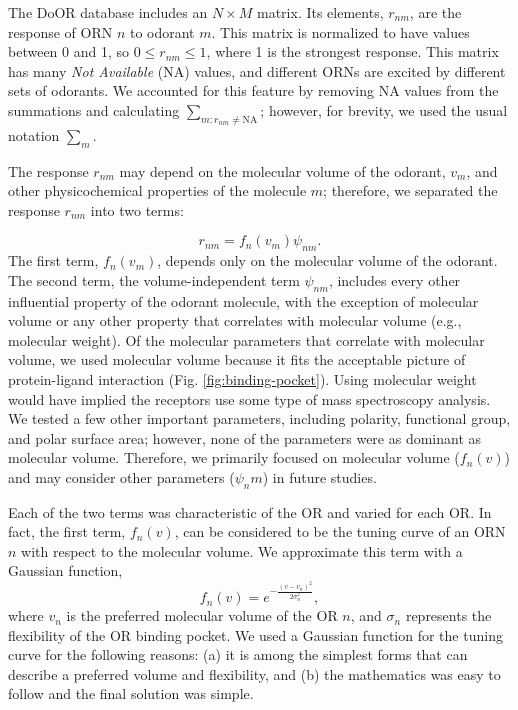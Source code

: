 \documentclass[fleqn,11pt]{wlscirep}
\begin{document}
The DoOR database includes an $N\times M$ matrix. 
Its elements, $r_{nm}$, are the response of ORN $n$ to odorant $m$. 
This matrix is normalized to have values between 0 and 1, so $0 \le r_{nm} \le 1$, where 1 is the strongest response.
This matrix has many {\it Not Available} (NA) values, 
and different ORNs are excited by different sets of odorants. 
We accounted for this feature by removing NA values from the summations and calculating $\sum_{m: r_{nm} \neq \text{NA}}$; however, 
for brevity, we used the usual notation $\sum_m$.

The response $r_{nm}$ may depend on the molecular volume of the odorant, $v_m$, 
and other physicochemical properties of the molecule $m$; 
therefore, we separated the response $r_{nm}$ into two terms:

\begin{equation}
	r_{nm} = f_n(v_m) \psi_{nm}.
	\label{eqn:factors}
\end{equation}
The first term, $f_n(v_m)$, depends only on the molecular volume of the odorant.
The second term, the volume-independent term $\psi_{nm}$, 
includes every other influential property of the odorant molecule, with the exception of 
molecular volume or any other property that correlates with molecular volume (e.g., molecular weight).
Of the molecular parameters that correlate with molecular volume, 
we used molecular volume because it fits the acceptable picture of protein-ligand interaction (Fig. \ref{fig:binding-pocket}).
Using molecular weight would have implied the receptors use  some type of mass spectroscopy analysis. 
We tested a few other important parameters, including polarity, functional group, and polar surface area; 
however, none of the parameters were as dominant as molecular volume. 
Therefore, we primarily focused on molecular volume ($f_n(v)$) and may consider other parameters ($\psi_nm$) in future studies.

Each of the two terms was characteristic of the OR and varied for each OR.
In fact, the first term, $f_n(v)$, can be considered to be the tuning curve of an ORN $n$ with respect to the molecular volume. 
We approximate this term with a Gaussian function,  
\begin{equation}
	\displaystyle f_n(v) = e^{-\frac{(v-v_n)^2}{2\sigma^2_n}}, 
	\label{eqn:volume-dependence}
\end{equation}
where $v_n$ is the preferred molecular volume of the OR $n$, and $\sigma_n$ represents the flexibility of the OR binding pocket. 
We used a Gaussian function for the tuning curve for the following reasons: (a) it is among the simplest forms that can describe a preferred volume and flexibility, and 
(b) the mathematics was easy to follow and the final solution was simple.
\end{document}
